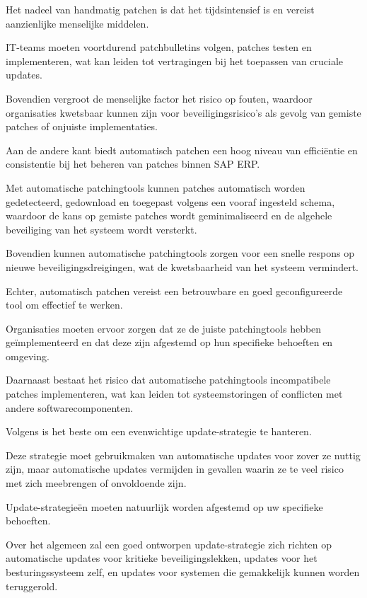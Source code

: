  \autocite{Hooper2018}
Het nadeel van handmatig patchen is dat het tijdsintensief is en vereist aanzienlijke menselijke middelen.

 IT-teams moeten voortdurend patchbulletins volgen, patches testen en implementeren, wat kan leiden tot vertragingen bij het toepassen van cruciale updates.

 Bovendien vergroot de menselijke factor het risico op fouten, waardoor organisaties kwetsbaar kunnen zijn voor beveiligingsrisico's als gevolg van gemiste patches of onjuiste implementaties.


Aan de andere kant biedt automatisch patchen een hoog niveau van efficiëntie en consistentie bij het beheren van patches binnen SAP ERP.

 Met automatische patchingtools kunnen patches automatisch worden gedetecteerd, gedownload en toegepast volgens een vooraf ingesteld schema, waardoor de kans op gemiste patches wordt geminimaliseerd en de algehele beveiliging van het systeem wordt versterkt.

 Bovendien kunnen automatische patchingtools zorgen voor een snelle respons op nieuwe beveiligingsdreigingen, wat de kwetsbaarheid van het systeem vermindert.


Echter, automatisch patchen vereist een betrouwbare en goed geconfigureerde tool om effectief te werken.

 Organisaties moeten ervoor zorgen dat ze de juiste patchingtools hebben geïmplementeerd en dat deze zijn afgestemd op hun specifieke behoeften en omgeving.

 Daarnaast bestaat het risico dat automatische patchingtools incompatibele patches implementeren, wat kan leiden tot systeemstoringen of conflicten met andere softwarecomponenten.



Volgens \textcite{Tozzi2017} is het beste om een evenwichtige update-strategie te hanteren.

 Deze strategie moet gebruikmaken van automatische updates voor zover ze nuttig zijn, maar automatische updates vermijden in gevallen waarin ze te veel risico met zich meebrengen of onvoldoende zijn.

 Update-strategieën moeten natuurlijk worden afgestemd op uw specifieke behoeften.

 Over het algemeen zal een goed ontworpen update-strategie zich richten op automatische updates voor kritieke beveiligingslekken, updates voor het besturingssysteem zelf, en updates voor systemen die gemakkelijk kunnen worden teruggerold.

